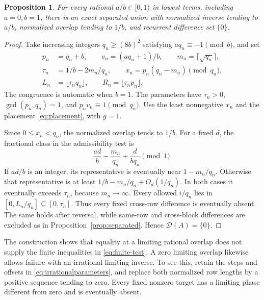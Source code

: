 \documentclass[11pt,leqno]{amsart}
\numberwithin{equation}{section}
\newtheorem{proposition}[theorem]{Proposition}
\theoremstyle{definition}
\theoremstyle{remark}
\newcommand{\D}{\mathcal D}
\begin{document}
\begin{proposition}\label{prop:rational}
For every rational $a/b\in[0,1)$ in lowest terms, including $a=0,b=1$, there is an exact separated union with normalized inverse tending to $a/b$, normalized overlap tending to $1/b$, and recurrent difference set $\{0\}$.
\end{proposition}
\begin{proof}
Take increasing integers $q_n\ge(8b)^2$ satisfying $aq_n\equiv-1\pmod b$, and set
\begin{equation}\label{eq:rationalparameters}
\begin{split}
p_n&=q_n+b,\qquad v_n=(aq_n+1)/b,\qquad m_n=\lceil\sqrt{q_n}\rceil,\\
\tau_n&=1/b-2m_n/q_n,\qquad
x_n=p_n(q_n-m_n)\pmod{q_n},\\
L_n&=\lfloor\tau_nq_n\rfloor,\qquad
R_n=\lfloor\tau_np_n\rfloor.
\end{split}
\end{equation}
The congruence is automatic when $b=1$. The parameters have $\tau_n>0$, $\gcd(p_n,q_n)=1$, and $p_nv_n\equiv1\pmod{q_n}$. Use the least nonnegative $x_n$ and the placement \eqref{eq:placement}, with $g=1$.

Since $0\le x_n<q_n$, the normalized overlap tends to $1/b$. For a fixed $d$, the fractional class in the admissibility test is
\begin{equation}\label{eq:rationalphase}
\frac{ad}{b}-\frac{m_n}{q_n}+\frac{d}{bq_n}\pmod1.
\end{equation}
If $ad/b$ is an integer, its representative is eventually near $1-m_n/q_n$. Otherwise that representative is at least $1/b-m_n/q_n+O_d(1/q_n)$. In both cases it eventually exceeds $\tau_n$, because $m_n\to\infty$. Every allowed $i/q_n$ lies in $[0,L_n/q_n]\subseteq[0,\tau_n]$. Thus every fixed cross-row difference is eventually absent. The same holds after reversal, while same-row and cross-block differences are excluded as in Proposition~\ref{prop:separated}. Hence $\D(A)=\{0\}$.
\end{proof}

The construction shows that equality at a limiting rational overlap does not supply the finite inequalities in \eqref{eq:finite-test}. A zero limiting overlap likewise allows failure with an irrational limiting inverse. To see this, retain the steps and offsets in \eqref{eq:irrationalparameters}, and replace both normalized row lengths by a positive sequence tending to zero. Every fixed nonzero target has a limiting phase different from zero and is eventually absent.
\end{document}
